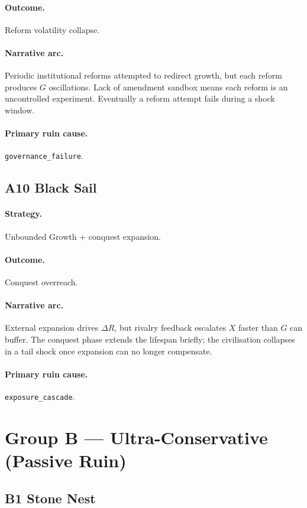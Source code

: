 \paragraph{Outcome.} Reform volatility collapse.
\paragraph{Narrative arc.}
Periodic institutional reforms attempted to redirect growth,
but each reform produces $G$ oscillations. Lack of amendment
sandbox means each reform is an uncontrolled experiment. Eventually
a reform attempt fails during a shock window.
\paragraph{Primary ruin cause.} \texttt{governance\_failure}.

\subsection{A10 Black Sail}
\label{civ:a10}

\paragraph{Strategy.} Unbounded Growth + conquest expansion.
\paragraph{Outcome.} Conquest overreach.
\paragraph{Narrative arc.}
External expansion drives $\Delta R$, but rivalry feedback
escalates $X$ faster than $G$ can buffer. The conquest phase
extends the lifespan briefly; the civilisation collapses in a tail
shock once expansion can no longer compensate.
\paragraph{Primary ruin cause.} \texttt{exposure\_cascade}.

\section{Group B --- Ultra-Conservative (Passive Ruin)}
\label{sec:civ-group-b}

\subsection{B1 Stone Nest}
\label{civ:b1}

